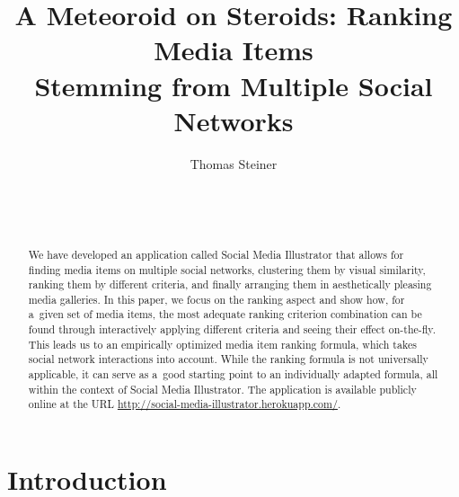 \documentclass{sig-alternate}
\newcommand{\inlinelistingsize}{\fontsize{8pt}{11pt}}
\let\oldurl\url
\renewcommand{\url}[1]{\inlinelistingsize\oldurl{#1}}
\begin{document}


\title{A Meteoroid on Steroids: Ranking Media Items\\ Stemming from Multiple Social Networks}

\author{
\alignauthor
Thomas Steiner\\
	\\
	\\
	\\
}
\maketitle

\begin{abstract}
We have developed an application called Social Media Illustrator
that allows for finding media items on multiple social networks,
clustering them by visual similarity, ranking them by different criteria,
and finally arranging them in aesthetically pleasing media galleries.
In this paper, we focus on the ranking aspect and show how,
for a~given set of media items, the most adequate ranking criterion combination
can be found through interactively applying different criteria
and seeing their effect on-the-fly.
This leads us to an empirically optimized media item ranking formula,
which takes social network interactions into account.
While the ranking formula is not universally applicable,
it can serve as a~good starting point to an individually adapted formula,
all within the context of Social Media Illustrator.
The application is available publicly online at the URL \url{http://social-media-illustrator.herokuapp.com/}.
\end{abstract}



\keywords{}

\section{Introduction}
\end{document}
